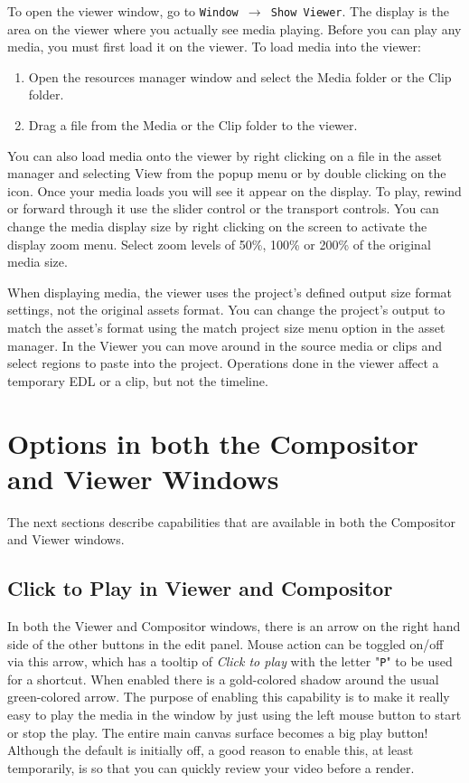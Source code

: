 To open the viewer window, go to \texttt{Window $\rightarrow$ Show Viewer}.  
The display is the area on the viewer where you actually see media playing.  
Before you can play any media, you must first load it on the viewer. 
To load media into the viewer:

\begin{enumerate}
    \item  Open the resources manager window and select the Media folder or the Clip folder.
    \item  Drag a file from the Media or the Clip folder to the viewer.
\end{enumerate}

You can also load media onto the viewer by right clicking on a file in the asset manager and selecting View from the popup menu or by double clicking on the icon. 
Once your media loads you will see it appear on the display. 
To play, rewind or forward through it use the slider control or the transport controls. 
You can change the media display size by right clicking on the screen to activate the display zoom menu. 
Select zoom levels of 50\%, 100\% or 200\% of the original media size.

When displaying media, the viewer uses the project's defined output size format settings, not the original assets format. 
You can change the project's output to match the asset's format using the match project size menu option in the asset manager. 
In the Viewer you can move around in the source media or clips and select regions to paste into the project. 
Operations done in the viewer affect a temporary EDL or a clip, but not the timeline.

\section{Options in both the Compositor and Viewer Windows}%
\label{sec:options_in_both_the_compositor_and_viewer_windows}

The next sections describe capabilities that are available in both the Compositor and Viewer windows.

\subsection{Click to Play in Viewer and Compositor}%
\label{sub:click_to_play_in_viewer_and_compositor}

In both the Viewer and Compositor windows, there is an arrow on the right hand side of the other buttons in the edit panel.  
Mouse action can be toggled on/off via this arrow, which has a tooltip of \textit{Click to play} with the letter "\texttt{P}" to be used for a shortcut.  
When enabled there is a gold-colored shadow around the usual green-colored arrow.  
The purpose of enabling this capability is to make it really easy to play the media in the window by just using the left mouse button to start or stop the play.  
The entire main canvas surface becomes a big play button!  
Although the default is initially off, a good reason to enable this, at least temporarily, is so that you can quickly review your video before a render. 
 
